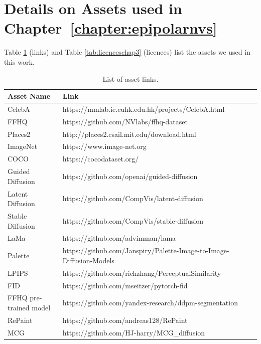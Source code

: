 \section{Details on Assets used in Chapter~\ref{chapter:epipolarnvs}}
\label{sec:GradPaint assets}



Table \ref{tab:linkschap3} (links) and Table \ref{tab:licenceschap3} (licences)
list the assets we used in this work.

\begin{table}[h]
\hspace{\sizeforappendix}
\footnotesize
\begin{tabular}{lll}
\toprule
\textbf{Asset Name} & \textbf{Link} \\
\midrule
CelebA & https://mmlab.ie.cuhk.edu.hk/projects/CelebA.html \\
FFHQ &  https://github.com/NVlabs/ffhq-dataset \\
Places2 &  http://places2.csail.mit.edu/download.html \\
ImageNet & https://www.image-net.org \\
COCO & https://cocodataset.org/ \\
Guided Diffusion & https://github.com/openai/guided-diffusion \\
Latent Diffusion & https://github.com/CompVis/latent-diffusion \\
Stable Diffusion & https://github.com/CompVis/stable-diffusion \\
LaMa & https://github.com/advimman/lama \\
Palette & https://github.com/Janspiry/Palette-Image-to-Image-Diffusion-Models \\
LPIPS &  https://github.com/richzhang/PerceptualSimilarity\\
FID & https://github.com/mseitzer/pytorch-fid \\ %
FFHQ pre-trained model & https://github.com/yandex-research/ddpm-segmentation \\ %
RePaint & https://github.com/andreas128/RePaint\\
MCG & https://github.com/HJ-harry/MCG\_diffusion\\
\bottomrule
\end{tabular}
\caption{List of asset links.}
\label{tab:linkschap3}
\end{table}


